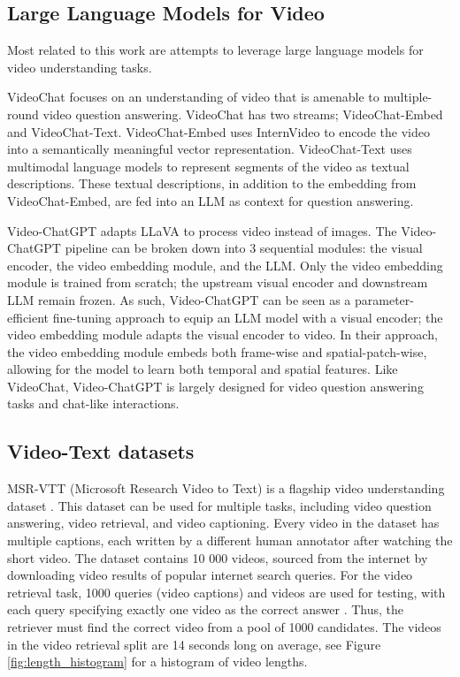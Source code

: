 \subsection{Large Language Models for Video}

Most related to this work are attempts to leverage large language models for video understanding tasks.

VideoChat \cite{videochat} focuses on an understanding of video that is amenable to multiple-round video question answering.
VideoChat has two streams; VideoChat-Embed and VideoChat-Text.
VideoChat-Embed uses InternVideo to encode the video into a semantically meaningful vector representation.
VideoChat-Text uses multimodal language models to represent segments of the video as textual descriptions. 
These textual descriptions, in addition to the embedding from VideoChat-Embed, are fed into an LLM as context for question answering.

Video-ChatGPT \cite{videochatgpt} adapts LLaVA to process video instead of images.
The Video-ChatGPT pipeline can be broken down into 3 sequential modules: the visual encoder, the video embedding module, and the LLM.
Only the video embedding module is trained from scratch; the upstream visual encoder and downstream LLM remain frozen.
As such, Video-ChatGPT can be seen as a parameter-efficient fine-tuning approach to equip an LLM model with a visual encoder; the video embedding module adapts the visual encoder to video.
In their approach, the video embedding module embeds both frame-wise and spatial-patch-wise, allowing for the model to learn both temporal and spatial features.
Like VideoChat, Video-ChatGPT is largely designed for video question answering tasks and chat-like interactions.

\subsection{Video-Text datasets}
MSR-VTT (Microsoft Research Video to Text) is a flagship video understanding dataset \cite{msr-vtt}.
This dataset can be used for multiple tasks, including video question answering, video retrieval, and video captioning.
Every video in the dataset has multiple captions, each written by a different human annotator after watching the short video.
The dataset contains 10 000 videos, sourced from the internet by downloading video results of popular internet search queries.
For the video retrieval task, 1000 queries (video captions) and videos are used for testing, with each query specifying exactly one video as the correct answer \cite{jsfusion}.
Thus, the retriever must find the correct video from a pool of 1000 candidates.
The videos in the video retrieval split are 14 seconds long on average, see Figure \ref{fig:length_histogram} for a histogram of video lengths.

